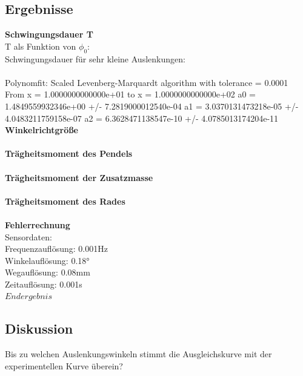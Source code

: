 \documentclass{article}
\begin{document}
\subsection{Ergebnisse}
\textbf{Schwingungsdauer T}\\
T als Funktion von $\phi_0$: \\
Schwingungsdauer für sehr kleine Auslenkungen:\\
\\
Polynomfit:
Scaled Levenberg-Marquardt algorithm with tolerance = 0.0001
From x = 1.0000000000000e+01 to x = 1.0000000000000e+02
a0 = 1.4849559932346e+00 +/- 7.2819000012540e-04
a1 = 3.0370131473218e-05 +/- 4.0483211759158e-07
a2 = 6.3628471138547e-10 +/- 4.0785013174204e-11
\textbf{Winkelrichtgröße}\\
\\
\textbf{Trägheitsmoment des Pendels}\\
\\
\textbf{Trägheitsmoment der Zusatzmasse}\\
\\
\textbf{Trägheitsmoment des Rades}\\
\\
\textbf{Fehlerrechnung}\\
Sensordaten:\\
Frequenzauflösung: 0.001Hz\\
Winkelauflösung: 0.18°\\
Wegauflösung: 0.08mm\\
Zeitauflösung: 0.001s\\
$\boxed{Endergebnis}$ %
\subsection{Diskussion}
Bis zu welchen Auslenkungswinkeln stimmt die Ausgleichskurve mit der experimentellen Kurve überein? 
\end{document}
